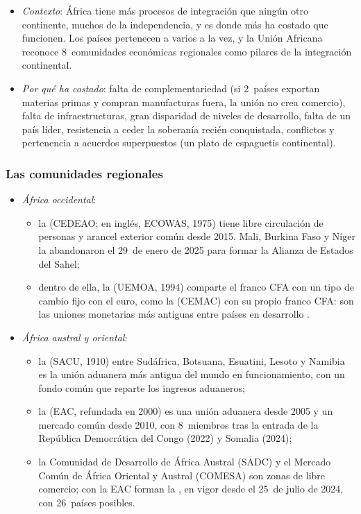 \documentclass[11pt]{article}
\begin{document}
\begin{itemize}
\item \emph{Contexto}: África tiene más procesos de integración que ningún otro continente, muchos de la independencia, y es donde más ha costado que funcionen. Los países pertenecen a varios a la vez, y la Unión Africana reconoce 8~comunidades económicas regionales como pilares de la integración continental.
\item \emph{Por qué ha costado}: falta de complementariedad (si 2~países exportan materias primas y compran manufacturas fuera, la unión no crea comercio), falta de infraestructuras, gran disparidad de niveles de desarrollo, falta de un país líder, resistencia a ceder la soberanía recién conquistada, conflictos y pertenencia a acuerdos superpuestos (un plato de espaguetis continental).
\end{itemize}

\subsubsection{Las comunidades regionales}\label{sec:africa-regionales}

\begin{itemize}
\item \emph{África occidental}:
  \begin{itemize}
  \item la  (CEDEAO; en inglés, ECOWAS, 1975) tiene libre circulación de personas y arancel exterior común desde 2015. Mali, Burkina Faso y Níger la abandonaron el 29~de enero de 2025 para formar la Alianza de Estados del Sahel\nocite{CEDEAO2025Salida};
  \item dentro de ella, la  (UEMOA, 1994) comparte el franco CFA con un tipo de cambio fijo con el euro, como la  (CEMAC) con su propio franco CFA: son las uniones monetarias más antiguas entre países en desarrollo .
  \end{itemize}
\item \emph{África austral y oriental}:
  \begin{itemize}
  \item la  (SACU, 1910) entre Sudáfrica, Botsuana, Esuatini, Lesoto y Namibia es la unión aduanera más antigua del mundo en funcionamiento\nocite{SACU2026Historia}, con un fondo común que reparte los ingresos aduaneros;
  \item la  (EAC, refundada en 2000) es una unión aduanera desde 2005 y un mercado común desde 2010, con 8~miembros tras la entrada de la República Democrática del Congo (2022) y Somalia (2024);
  \item la Comunidad de Desarrollo de África Austral (SADC) y el Mercado Común de África Oriental y Austral (COMESA) son zonas de libre comercio; con la EAC forman la , en vigor desde el 25~de julio de 2024, con 26~países posibles.
  \end{itemize}
\end{itemize}
\end{document}
